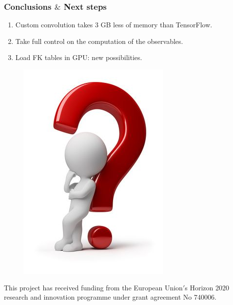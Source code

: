 \documentclass[aspectratio=43]{beamer}
\begin{document}
\begin{frame}
	
	\frametitle{Conclusions $\&$ Next steps}

	\begin{enumerate}
		\item Custom convolution takes 3 GB less of memory than TensorFlow.
		\item Take full control on the computation of the observables.
		\item Load FK tables in GPU: new possibilities.
	\end{enumerate}

\end{frame}

\begin{frame}


	\begin{figure}
		\includegraphics[width = 3 cm]{thinking2.png}
	\end{figure}
	
	{\color{blue}This project has received funding from the European Union$'$s Horizon 2020 research and innovation programme under grant agreement No 740006.}

\end{frame}
\end{document}
